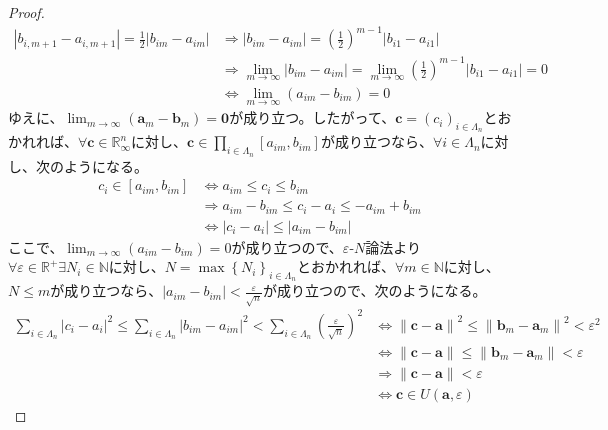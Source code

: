 \documentclass[dvipdfmx]{jsarticle}
\begin{document}
\begin{proof}
\begin{align*}
\left| b_{i,m + 1} - a_{i,m + 1} \right| = \frac{1}{2}\left| b_{im} - a_{im} \right| &\Rightarrow \left| b_{im} - a_{im} \right| = \left( \frac{1}{2} \right)^{m - 1}\left| b_{i1} - a_{i1} \right|\\
&\Rightarrow \lim_{m \rightarrow \infty}\left| b_{im} - a_{im} \right| = \lim_{m \rightarrow \infty}{\left( \frac{1}{2} \right)^{m - 1}\left| b_{i1} - a_{i1} \right|} = 0\\
&\Leftrightarrow \lim_{m \rightarrow \infty}\left( a_{im} - b_{im} \right) = 0
\end{align*}
ゆえに、$\lim_{m \rightarrow \infty}\left( \mathbf{a}_{m} - \mathbf{b}_{m} \right) = \mathbf{0}$が成り立つ。したがって、$\mathbf{c} = \left( c_{i} \right)_{i \in \varLambda_{n}}$とおかれれば、$\forall\mathbf{c} \in \mathbb{R}_{\infty}^{n}$に対し、$\mathbf{c} \in \prod_{i \in \varLambda_{n}} \left[ a_{im},b_{im} \right]$が成り立つなら、$\forall i \in \varLambda_{n}$に対し、次のようになる。
\begin{align*}
c_{i} \in \left[ a_{im},b_{im} \right] &\Leftrightarrow a_{im} \leq c_{i} \leq b_{im}\\
&\Rightarrow a_{im} - b_{im} \leq c_{i} - a_{i} \leq - a_{im} + b_{im}\\
&\Leftrightarrow \left| c_{i} - a_{i} \right| \leq \left| a_{im} - b_{im} \right|
\end{align*}
ここで、$\lim_{m \rightarrow \infty}\left( a_{im} - b_{im} \right) = 0$が成り立つので、$\varepsilon$-$N$論法より$\forall\varepsilon \in \mathbb{R}^{+}\exists N_{i} \in \mathbb{N}$に対し、$N = \max\left\{ N_{i} \right\}_{i \in \varLambda_{n}}$とおかれれば、$\forall m \in \mathbb{N}$に対し、$N \leq m$が成り立つなら、$\left| a_{im} - b_{im} \right| < \frac{\varepsilon}{\sqrt{n}}$が成り立つので、次のようになる。
\begin{align*}
\sum_{i \in \varLambda_{n}} \left| c_{i} - a_{i} \right|^{2} \leq \sum_{i \in \varLambda_{n}} \left| b_{im} - a_{im} \right|^{2} < \sum_{i \in \varLambda_{n}} \left( \frac{\varepsilon}{\sqrt{n}} \right)^{2} &\Leftrightarrow \left\| \mathbf{c} - \mathbf{a} \right\|^{2} \leq \left\| \mathbf{b}_{m} - \mathbf{a}_{m} \right\|^{2} < \varepsilon^{2}\\
&\Leftrightarrow \left\| \mathbf{c} - \mathbf{a} \right\| \leq \left\| \mathbf{b}_{m} - \mathbf{a}_{m} \right\| < \varepsilon\\
&\Rightarrow \left\| \mathbf{c} - \mathbf{a} \right\| < \varepsilon\\
&\Leftrightarrow \mathbf{c} \in U\left( \mathbf{a},\varepsilon \right)

\end{align*}
\end{proof}
\end{document}
